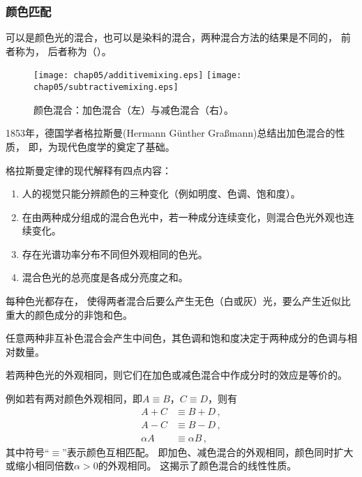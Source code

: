 \subsubsection*{颜色匹配}
可以是颜色光的混合，也可以是染料的混合，两种混合方法的结果是不同的，
前者称为，
后者称为（）。
\begin{figure}[htb]
      \centering
      \texttt{[image: chap05/additivemixing.eps]}
      \texttt{[image: chap05/subtractivemixing.eps]}
      \caption{颜色混合：加色混合（左）与减色混合（右）。}
      \label{fig:5.ex06}
\end{figure}

1853年，德国学者格拉斯曼(Hermann Günther Gra{\ss}mann)总结出加色混合的性质，
即，为现代色度学的奠定了基础。

\begin{proposition}
      格拉斯曼定律的现代解释有四点内容：
      \begin{enumerate}
            \item 人的视觉只能分辨颜色的三种变化（例如明度、色调、饱和度）。
            \item 在由两种成分组成的混合色光中，若一种成分连续变化，则混合色光外观也连续变化。
            \item 存在光谱功率分布不同但外观相同的色光。
            \item 混合色光的总亮度是各成分亮度之和。
      \end{enumerate}
\end{proposition}
\begin{corollary}
      每种色光都存在，
      使得两者混合后要么产生无色（白或灰）光，要么产生近似比重大的颜色成分的非饱和色。
\end{corollary}
\begin{corollary}
      任意两种非互补色混合会产生中间色，其色调和饱和度决定于两种成分的色调与相对数量。
\end{corollary}
\begin{corollary}
      若两种色光的外观相同，则它们在加色或减色混合中作成分时的效应是等价的。
\end{corollary}

例如若有两对颜色外观相同，即$A\equiv B$，$C\equiv D$，则有
\begin{align}
      A+C      & \equiv B+D\, ,      \\
      A-C      & \equiv B-D\, ,      \\
      \alpha A & \equiv \alpha B\, ,
\end{align}
其中符号“$\equiv$”表示颜色互相匹配。
即加色、减色混合的外观相同，颜色同时扩大或缩小相同倍数$\alpha>0$的外观相同。
这揭示了颜色混合的线性性质。

